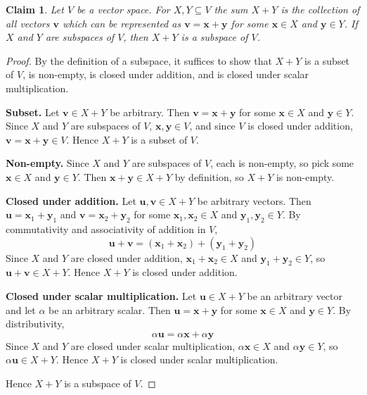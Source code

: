\documentclass{article}
\newtheorem*{claim}{Claim}
\begin{document}
\begin{claim}
    Let $V$ be a vector space. For $X, Y \subseteq V$ the sum $X + Y$ is the collection of all vectors
    $\mathbf{v}$ which can be represented as $\mathbf{v} = \mathbf{x} + \mathbf{y}$ for some 
    $\mathbf{x} \in X$ and $\mathbf{y} \in Y$. If $X$ and $Y$ are subspaces of $V$, then $X + Y$ is a subspace 
    of $V$.
\end{claim}

\begin{proof}
    By the definition of a subspace, it suffices to show that $X + Y$ is a subset of $V$, is non-empty, is 
    closed under addition, and is closed under scalar multiplication.

    \medskip
    \textbf{Subset.} Let $\mathbf{v} \in X + Y$ be arbitrary. Then $\mathbf{v} = \mathbf{x} + \mathbf{y}$ for 
    some $\mathbf{x} \in X$ and $\mathbf{y} \in Y$. Since $X$ and $Y$ are subspaces of $V$, 
    $\mathbf{x}, \mathbf{y} \in V$, and since $V$ is closed under addition, 
    $\mathbf{v} = \mathbf{x} + \mathbf{y} \in V$. Hence $X + Y$ is a subset of $V$.

    \medskip
    \textbf{Non-empty.} Since $X$ and $Y$ are subspaces of $V$, each is non-empty, so pick some 
    $\mathbf{x} \in X$ and $\mathbf{y} \in Y$. Then $\mathbf{x} + \mathbf{y} \in X + Y$ by definition, 
    so $X + Y$ is non-empty.

    \medskip
    \textbf{Closed under addition.} Let $\mathbf{u}, \mathbf{v} \in X + Y$ be arbitrary vectors. Then 
    $\mathbf{u} = \mathbf{x}_1 + \mathbf{y}_1$ and $\mathbf{v} = \mathbf{x}_2 + \mathbf{y}_2$ for some 
    $\mathbf{x}_1, \mathbf{x}_2 \in X$ and $\mathbf{y}_1, \mathbf{y}_2 \in Y$. By commutativity and 
    associativity of addition in $V$,
    \[
    \mathbf{u} + \mathbf{v} = (\mathbf{x}_1 + \mathbf{x}_2) + (\mathbf{y}_1 + \mathbf{y}_2)
    \]
    Since $X$ and $Y$ are closed under addition, $\mathbf{x}_1 + \mathbf{x}_2 \in X$ and 
    $\mathbf{y}_1 + \mathbf{y}_2 \in Y$, so $\mathbf{u} + \mathbf{v} \in X + Y$. Hence $X + Y$ is closed 
    under addition.

    \medskip
    \textbf{Closed under scalar multiplication.} Let $\mathbf{u} \in X + Y$ be an arbitrary vector and let 
    $\alpha$ be an arbitrary scalar. Then $\mathbf{u} = \mathbf{x} + \mathbf{y}$ for some $\mathbf{x} \in X$ 
    and $\mathbf{y} \in Y$. By distributivity, 
    \[
    \alpha \mathbf{u} = \alpha \mathbf{x} + \alpha \mathbf{y}
    \]
    Since $X$ and $Y$ are closed under scalar multiplication, $\alpha \mathbf{x} \in X$ and 
    $\alpha \mathbf{y} \in Y$, so $\alpha \mathbf{u} \in X + Y$. Hence $X + Y$ is closed under scalar 
    multiplication.

    \medskip

    Hence $X + Y$ is a subspace of $V$.
\end{proof}
\end{document}
